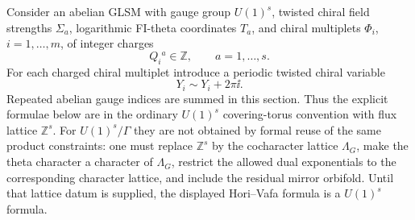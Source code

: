 Consider an abelian GLSM with gauge group \(U(1)^s\), twisted chiral field
strengths \(\Sigma_a\), logarithmic FI-theta coordinates \(T_a\), and
chiral multiplets \(\Phi_i\), \(i=1,\ldots,m\), of integer charges
\[
  Q_i{}^a\in\mathbb Z,\qquad a=1,\ldots,s .
\]
For each charged chiral multiplet introduce a periodic twisted chiral
variable
\[
  Y_i\sim Y_i+2\pi\ii .
\]
Repeated abelian gauge indices are summed in this section.  Thus the explicit
formulae below are in the ordinary \(U(1)^s\) covering-torus convention with
flux lattice \(\mathbb Z^s\).  For \(U(1)^s/\Gamma\) they are not obtained by
formal reuse of the same product constraints: one must replace \(\mathbb Z^s\)
by the cocharacter lattice \(\Lambda_G\), make the theta character a character
of \(\Lambda_G\), restrict the allowed dual exponentials to the corresponding
character lattice, and include the residual mirror orbifold.  Until that
lattice datum is supplied, the displayed Hori--Vafa formula is a \(U(1)^s\)
formula.

